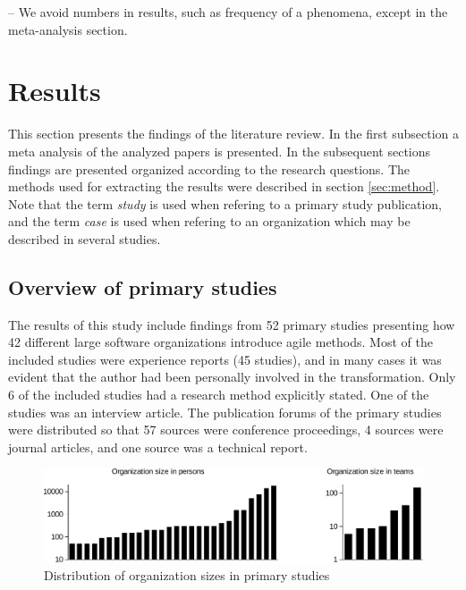 \documentclass[preprint,authoryear,12pt]{elsarticle}
\begin{document}
-- We avoid numbers in results, such as frequency of a phenomena, except in the
   meta-analysis section.

\section{Results}
\label{sec:results}

This section presents the findings of the literature review. In the first
subsection a meta analysis of the analyzed papers is presented. In the
subsequent sections findings are presented organized according to the research
questions. The methods used for extracting the results were described in section
\ref{sec:method}. Note that the term \emph{study} is used when refering to a
primary study publication, and the term \emph{case} is used when refering to an
organization which may be described in several studies.

\subsection{Overview of primary studies}

The results of this study include findings from 52 primary studies presenting
how 42 different large software organizations introduce agile methods. Most of
the included studies were experience reports (45 studies), and in many cases it
was evident that the author had been personally involved in the transformation.
Only 6 of the included studies had a research method explicitly stated. One of
the studies was an interview article. The publication forums of the primary
studies were distributed so that 57 sources were conference proceedings, 4
sources were journal articles, and one source was a technical report.

\begin{figure}[b]
  \begin{center}
    \includegraphics[width=1\textwidth]{graphics/organization_size.pdf}
    \caption{Distribution of organization sizes in primary studies}
    \label{fig:organization_size}
  \end{center}
\end{figure}
\end{document}
